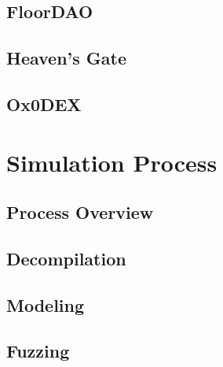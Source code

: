 \chapter{FloorDAO} \label{ch:case-study-floor-dao}

\chapter{Heaven's Gate} \label{ch:case-study-heavens-gate}

\chapter{Ox0DEX} \label{ch:case-study-0x0dex}



\part{Simulation Process} \label{sec:simulation-process}
\chapter{Process Overview} \label{ch:process-overview}

\chapter{Decompilation} \label{ch:decompilation}

\chapter{Modeling} \label{ch:modeling}

\chapter{Fuzzing} \label{ch:fuzzing}



